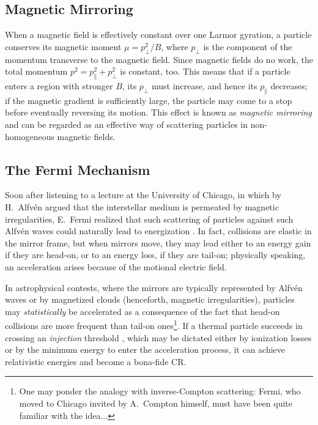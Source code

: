\documentclass[varenna]{cimento}
\newcommand{\alf}{Alfv\'en }
\begin{document}
\subsection{Magnetic Mirroring}
When a magnetic field is effectively constant over one Larmor gyration, a particle conserves its magnetic moment $\mu=p_\perp^2/B$, where $p_\perp$ is the component of the momentum transverse to the magnetic field. 
Since magnetic fields do no work, the total momentum $p^2= p_\parallel^2 + p^2_\perp$ is constant, too. 
This means that if a particle enters a region with stronger $B$, its $p_\perp$ must increase, and hence its $p_\parallel$ decreases;
if the magnetic gradient is sufficiently large, the particle may come to a stop before eventually reversing its motion.
This effect is known as \emph{magnetic mirroring} and can be regarded as an effective way of scattering particles in non-homogeneous magnetic fields.


\subsection{The Fermi Mechanism}\label{ssub:fermimec}
Soon after listening to a lecture at the University of Chicago, in which  by H.~\alf  argued that the interstellar medium is permeated by magnetic irregularities, E.~Fermi realized that such scattering of particles against such \alf waves could naturally lead to energization \cite{fermi49,fermi54}. 
In fact, collisions are elastic in the mirror frame, but 
when mirrors move, they may lead either to an energy gain if they are head-on, or to an energy loss, if they are tail-on;
physically speaking, an acceleration arises because of the motional electric field.

In astrophysical contests, where the mirrors are typically represented by Alfv\'en waves or by magnetized clouds (henceforth, magnetic irregularities), particles may \emph{statistically} be accelerated as a consequence of the fact that head-on collisions are more frequent than tail-on ones\footnote{One may ponder the analogy with inverse-Compton scattering: Fermi, who moved to Chicago invited by A.~Compton himself, must have been quite familiar with the idea...}.
If a thermal particle succeeds in crossing an \emph{injection}  threshold \cite{caprioli+15}, which may be dictated either by ionization losses or by the minimum energy to enter the acceleration process, it can achieve relativistic energies and become a bona-fide CR.
\end{document}
